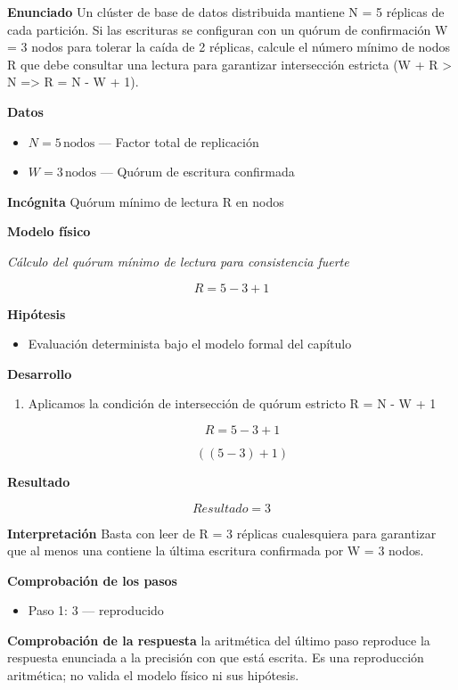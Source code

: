 \documentclass{book}
\begin{document}
\begin{tcolorbox}[title={Problema resuelto}, studiumworked, breakable]

\noindent\textbf{Enunciado}
Un clúster de base de datos distribuida mantiene N = 5 réplicas de cada partición. Si las escrituras se configuran con un quórum de confirmación W = 3 nodos para tolerar la caída de 2 réplicas, calcule el número mínimo de nodos R que debe consultar una lectura para garantizar intersección estricta (W + R > N => R = N - W + 1).

\noindent\textbf{Datos}
\begin{itemize}
\item $N = 5\,\mathrm{nodos}$ — Factor total de replicación
\item $W = 3\,\mathrm{nodos}$ — Quórum de escritura confirmada
\end{itemize}

\noindent\textbf{Incógnita}
Quórum mínimo de lectura R en nodos

\noindent\textbf{Modelo físico}

\noindent\textit{Cálculo del quórum mínimo de lectura para consistencia fuerte}

\[
R = 5 - 3 + 1
\]

\noindent\textbf{Hipótesis}
\begin{itemize}
\item Evaluación determinista bajo el modelo formal del capítulo
\end{itemize}

\noindent\textbf{Desarrollo}
\begin{enumerate}
\item
Aplicamos la condición de intersección de quórum estricto R = N - W + 1

\[
R = 5 - 3 + 1
\]

\[
\left(\left(5-3\right)+1\right)
\]
\end{enumerate}

\noindent\textbf{Resultado}

\[
Resultado = 3
\]

\noindent\textbf{Interpretación}
Basta con leer de R = 3 réplicas cualesquiera para garantizar que al menos una contiene la última escritura confirmada por W = 3 nodos.

\noindent\textbf{Comprobación de los pasos}
\begin{itemize}
\item Paso 1: $3$ — reproducido
\end{itemize}

\noindent\textbf{Comprobación de la respuesta} la aritmética del último paso reproduce la respuesta enunciada a la precisión con que está escrita. Es una reproducción aritmética; no valida el modelo físico ni sus hipótesis.
\end{tcolorbox}
\end{document}
